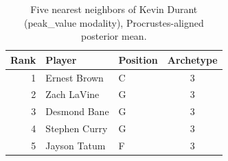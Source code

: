 \begin{table}[htbp]
  \centering\small
  \begin{tabular}{rllc}
    \toprule
    Rank & Player & Position & Archetype \\
    \midrule
    1 & Ernest Brown & C & 3 \\
    2 & Zach LaVine & G & 3 \\
    3 & Desmond Bane & G & 3 \\
    4 & Stephen Curry & G & 3 \\
    5 & Jayson Tatum & F & 3 \\
    \bottomrule
  \end{tabular}
  \caption{Five nearest neighbors of Kevin Durant (peak_value modality), Procrustes-aligned posterior mean.}
  \label{tab:Kevin_Durant_neighbors_peak_value}
\end{table}

